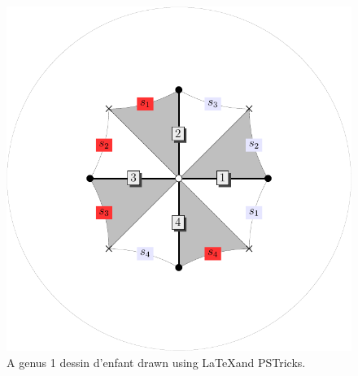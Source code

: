 \documentclass[a4paper]{adcv}
\begin{document}
\begin{figure}[ht]\label{fig:dessin}
  \centering
  \includegraphics[scale=0.2]{belyi1.pdf}
  \caption{
    A genus 1 dessin d'enfant drawn using \LaTeX and PSTricks.
  }
\end{figure}
\end{document}
